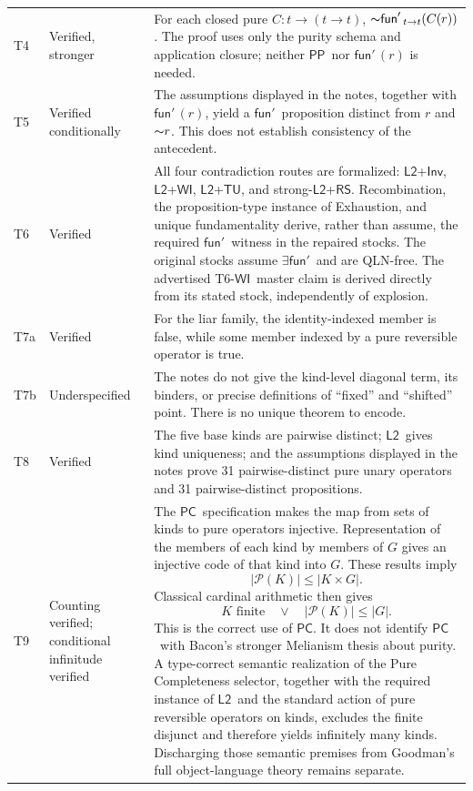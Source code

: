 \documentclass[12pt,leqno]{article}
\newcommand{\OR}{\ensuremath{\vee}}
\newcommand{\IC}{\ensuremath{\rightarrow}}
\newcommand{\NOT}{\ensuremath{\text{$\thicksim$}}}
\theoremstyle{plain}
\theoremstyle{definition}
\newcommand{\funp}{\ensuremath{\mathsf{fun}'\,}}
\newcommand{\PP}{\ensuremath{\mathsf{PP}}}
\newcommand{\Ltwo}{\ensuremath{\mathsf{L2}}}
\newcommand{\TU}{\ensuremath{\mathsf{TU}}}
\newcommand{\WI}{\ensuremath{\mathsf{WI}}}
\newcommand{\Inv}{\ensuremath{\mathsf{Inv}}}
\newcommand{\RS}{\ensuremath{\mathsf{RS}}}
\newcommand{\PC}{\ensuremath{\mathsf{PC}}}
\newcommand{\Pow}{\ensuremath{\mathcal{P}}}
\begin{document}
\begin{longtable}{>{\raggedright\arraybackslash}p{0.55in}
                  >{\raggedright\arraybackslash}p{1.18in}
                  >{\raggedright\arraybackslash}p{4.35in}}
T4 & Verified, stronger &
For each closed pure \(C:t\IC(t\IC t)\),
\(\NOT\funp_{t\IC t}(C(r))\).  The proof uses only the purity schema and
application closure; neither \PP\ nor \(\funp(r)\) is needed.\\

T5 & Verified conditionally &
The assumptions displayed in the notes, together with \(\funp(r)\), yield a \(\funp\) proposition distinct
from \(r\) and \(\NOT r\).  This does not establish consistency of the
antecedent.\\

T6 & Verified &
All four contradiction routes are formalized: \Ltwo+\Inv,
\Ltwo+\WI, \Ltwo+\TU, and strong-\Ltwo+\RS.  Recombination, the
proposition-type instance of Exhaustion, and unique fundamentality derive,
rather than assume, the required \(\funp\) witness in the repaired stocks.
The original stocks assume \(\exists\funp\) and are QLN-free.  The
advertised T6-\WI\ master claim is derived directly from its stated stock,
independently of explosion.\\

T7a & Verified &
For the liar family, the identity-indexed member is false, while some
member indexed by a pure reversible operator is true.\\

T7b & Underspecified &
The notes do not give the kind-level diagonal term, its binders, or precise
definitions of ``fixed'' and ``shifted'' point.  There is no unique theorem
to encode.\\

T8 & Verified &
The five base kinds are pairwise distinct; \Ltwo\ gives kind uniqueness; and
the assumptions displayed in the notes prove 31 pairwise-distinct pure unary operators and 31
pairwise-distinct propositions.\\

T9 & Counting verified; conditional infinitude verified &
The \PC\ specification makes the map from sets of kinds to pure operators
injective.  Representation of the members of each kind by members of \(G\)
gives an injective code of that kind into \(G\).  These results imply
\[
 |\Pow(K)|\leq |K\times G|.
\]
Classical cardinal arithmetic then gives
\[
 K\text{ finite}\quad\OR\quad |\Pow(K)|\leq |G|.
\]
This is the correct use of \PC.  It does not identify \PC\ with Bacon's
stronger Melianism thesis about purity.
A type-correct semantic realization of the Pure Completeness selector,
together with the required instance of \Ltwo\ and the standard action of pure reversible
operators on kinds, excludes the finite disjunct and therefore yields
infinitely many kinds.  Discharging those semantic premises from Goodman's
full object-language theory remains separate.\\
\bottomrule
\end{longtable}
\end{document}
